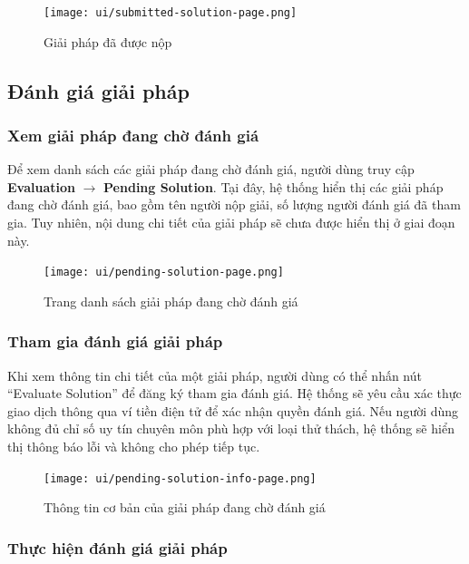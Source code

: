 \begin{figure}[H]
  \centering
  \texttt{[image: ui/submitted-solution-page.png]}
  \caption{Giải pháp đã được nộp}
  \label{fig:submitted-solution-page}
\end{figure}

\subsection{Đánh giá giải pháp}

\subsubsection{Xem giải pháp đang chờ đánh giá}

Để xem danh sách các giải pháp đang chờ đánh giá, người dùng truy cập \textbf{Evaluation} $\rightarrow$ \textbf{Pending Solution}.  
Tại đây, hệ thống hiển thị các giải pháp đang chờ đánh giá, bao gồm tên người nộp giải, số lượng người đánh giá đã tham gia.  
Tuy nhiên, nội dung chi tiết của giải pháp sẽ chưa được hiển thị ở giai đoạn này.

\begin{figure}[H]
  \centering
  \texttt{[image: ui/pending-solution-page.png]}
  \caption{Trang danh sách giải pháp đang chờ đánh giá}
  \label{fig:pending-solution-page}
\end{figure}

\subsubsection{Tham gia đánh giá giải pháp}

Khi xem thông tin chi tiết của một giải pháp, người dùng có thể nhấn nút ``Evaluate Solution'' để đăng ký tham gia đánh giá.  
Hệ thống sẽ yêu cầu xác thực giao dịch thông qua ví tiền điện tử để xác nhận quyền đánh giá.
Nếu người dùng không đủ chỉ số uy tín chuyên môn phù hợp với loại thử thách, hệ thống sẽ hiển thị thông báo lỗi và không cho phép tiếp tục.

\begin{figure}[H]
  \centering
  \texttt{[image: ui/pending-solution-info-page.png]}
  \caption{Thông tin cơ bản của giải pháp đang chờ đánh giá}
  \label{fig:pending-solution-info-page}
\end{figure}

\subsubsection{Thực hiện đánh giá giải pháp}

